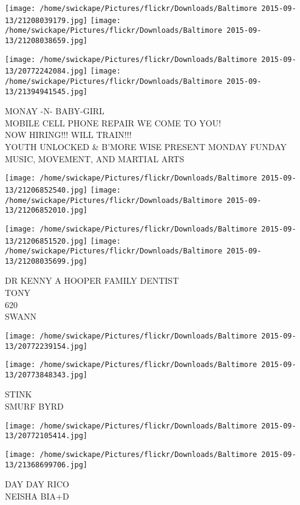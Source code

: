 \documentclass[10pt,letterpaper]{article}
\begin{document}
\texttt{[image: /home/swickape/Pictures/flickr/Downloads/Baltimore 2015-09-13/21208039179.jpg]}
\texttt{[image: /home/swickape/Pictures/flickr/Downloads/Baltimore 2015-09-13/21208038659.jpg]}

\texttt{[image: /home/swickape/Pictures/flickr/Downloads/Baltimore 2015-09-13/20772242084.jpg]}
\texttt{[image: /home/swickape/Pictures/flickr/Downloads/Baltimore 2015-09-13/21394941545.jpg]}

MONAY {-}N{-} BABY{-}GIRL\\
MOBILE CELL PHONE REPAIR WE COME TO YOU!\\
NOW HIRING!!! WILL TRAIN!!!\\
YOUTH UNLOCKED \& B'MORE WISE PRESENT MONDAY FUNDAY MUSIC, MOVEMENT, AND MARTIAL ARTS
\pagebreak

\texttt{[image: /home/swickape/Pictures/flickr/Downloads/Baltimore 2015-09-13/21206852540.jpg]}
\texttt{[image: /home/swickape/Pictures/flickr/Downloads/Baltimore 2015-09-13/21206852010.jpg]}

\texttt{[image: /home/swickape/Pictures/flickr/Downloads/Baltimore 2015-09-13/21206851520.jpg]}
\texttt{[image: /home/swickape/Pictures/flickr/Downloads/Baltimore 2015-09-13/21208035699.jpg]}

DR KENNY A HOOPER FAMILY DENTIST\\
TONY\\
620\\
SWANN
\pagebreak

\texttt{[image: /home/swickape/Pictures/flickr/Downloads/Baltimore 2015-09-13/20772239154.jpg]}

\vspace{0.25in}
\texttt{[image: /home/swickape/Pictures/flickr/Downloads/Baltimore 2015-09-13/20773848343.jpg]}

STINK\\
SMURF BYRD
\pagebreak

\texttt{[image: /home/swickape/Pictures/flickr/Downloads/Baltimore 2015-09-13/20772105414.jpg]}

\vspace{0.25in}
\texttt{[image: /home/swickape/Pictures/flickr/Downloads/Baltimore 2015-09-13/21368699706.jpg]}

DAY DAY RICO\\
NEISHA BIA+D
\pagebreak
\end{document}
